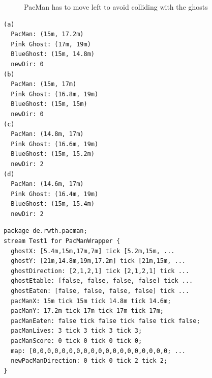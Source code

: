 \begin{figure}[!h]
	\caption{PacMan has to move left to avoid colliding with the ghosts} 
	\label{fig:pacManFleeing}
\end{figure}
\begin{lstlisting}[caption={Values for the stream test},label=lst:pmStreamValues, frame=single]
(a)
  PacMan: (15m, 17.2m) 
  Pink Ghost: (17m, 19m) 
  BlueGhost: (15m, 14.8m) 
  newDir: 0
(b)	
  PacMan: (15m, 17m) 
  Pink Ghost: (16.8m, 19m) 
  BlueGhost: (15m, 15m) 
  newDir: 0
(c)	
  PacMan: (14.8m, 17m) 
  Pink Ghost: (16.6m, 19m) 
  BlueGhost: (15m, 15.2m) 
  newDir: 2
(d)	
  PacMan: (14.6m, 17m) 
  Pink Ghost: (16.4m, 19m)
  BlueGhost: (15m, 15.4m)
  newDir: 2
\end{lstlisting}

\begin{lstlisting}[caption={Stream test for the scenario above},label=lst:pmStreamTest, frame=single, morekeywords={tick, stream, for, package}]
package de.rwth.pacman;
stream Test1 for PacManWrapper {
  ghostX: [5.4m,15m,17m,7m] tick [5.2m,15m, ...
  ghostY: [21m,14.8m,19m,17.2m] tick [21m,15m, ...
  ghostDirection: [2,1,2,1] tick [2,1,2,1] tick ...
  ghostEtable: [false, false, false, false] tick ...
  ghostEaten: [false, false, false, false] tick ...
  pacManX: 15m tick 15m tick 14.8m tick 14.6m;
  pacManY: 17.2m tick 17m tick 17m tick 17m;
  pacManEaten: false tick false tick false tick false;
  pacManLives: 3 tick 3 tick 3 tick 3;
  pacManScore: 0 tick 0 tick 0 tick 0;
  map: [0,0,0,0,0,0,0,0,0,0,0,0,0,0,0,0,0,0,0; ...
  newPacManDirection: 0 tick 0 tick 2 tick 2;
}
\end{lstlisting}

